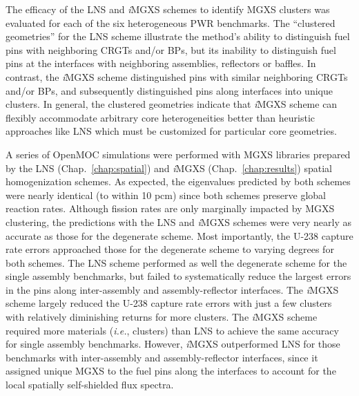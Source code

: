 The efficacy of the \ac{LNS} and \textit{i}\ac{MGXS} schemes to identify \ac{MGXS} clusters was evaluated for each of the six heterogeneous \ac{PWR} benchmarks. The ``clustered geometries'' for the \ac{LNS} scheme illustrate the method's ability to distinguish fuel pins with neighboring \acp{CRGT} and/or \acp{BP}, but its inability to distinguish fuel pins at the interfaces with neighboring assemblies, reflectors or baffles. In contrast, the \textit{i}\ac{MGXS} scheme distinguished pins with similar neighboring \acp{CRGT} and/or \acp{BP}, and subsequently distinguished pins along interfaces into unique clusters. In general, the clustered geometries indicate that \textit{i}\ac{MGXS} scheme can flexibly accommodate arbitrary core heterogeneities better than heuristic approaches like \ac{LNS} which must be customized for particular core geometries.

A series of OpenMOC simulations were performed with \ac{MGXS} libraries prepared by the \ac{LNS} (Chap.~\ref{chap:spatial}) and \textit{i}\ac{MGXS} (Chap.~\ref{chap:results}) spatial homogenization schemes. As expected, the eigenvalues predicted by both schemes were nearly identical (to within 10 \ac{pcm}) since both schemes preserve global reaction rates. Although fission rates are only marginally impacted by \ac{MGXS} clustering, the predictions with the \ac{LNS} and \textit{i}\ac{MGXS} schemes were very nearly as accurate as those for the degenerate scheme. Most importantly, the U-238 capture rate errors approached those for the degenerate scheme to varying degrees for both schemes. The \ac{LNS} scheme performed as well the degenerate scheme for the single assembly benchmarks, but failed to systematically reduce the largest errors in the pins along inter-assembly and assembly-reflector interfaces. The \textit{i}\ac{MGXS} scheme largely reduced the U-238 capture rate errors with just a few clusters with relatively diminishing returns for more clusters. The \textit{i}\ac{MGXS} scheme required more materials (\textit{i.e.}, clusters) than \ac{LNS} to achieve the same accuracy for single assembly benchmarks. However, \textit{i}\ac{MGXS} outperformed \ac{LNS} for those benchmarks with inter-assembly and assembly-reflector interfaces, since it assigned unique \ac{MGXS} to the fuel pins along the interfaces to account for the local spatially self-shielded flux spectra.


